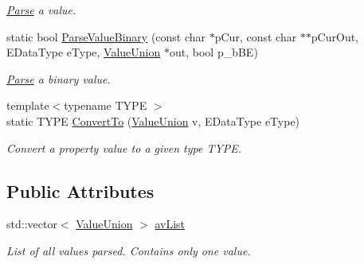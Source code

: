 \begin{DoxyCompactItemize}
\begin{DoxyCompactList}\small\item\em \hyperlink{struct_parse}{Parse} a value. \end{DoxyCompactList}\item 
\hypertarget{class_assimp_1_1_p_l_y_1_1_property_instance_a4ab7501c25c3cc1078b71b711981ecdf}{static bool \hyperlink{class_assimp_1_1_p_l_y_1_1_property_instance_a4ab7501c25c3cc1078b71b711981ecdf}{Parse\+Value\+Binary} (const char $\ast$p\+Cur, const char $\ast$$\ast$p\+Cur\+Out, E\+Data\+Type e\+Type, \hyperlink{union_assimp_1_1_p_l_y_1_1_property_instance_1_1_value_union}{Value\+Union} $\ast$out, bool p\+\_\+b\+B\+E)}\label{class_assimp_1_1_p_l_y_1_1_property_instance_a4ab7501c25c3cc1078b71b711981ecdf}

\begin{DoxyCompactList}\small\item\em \hyperlink{struct_parse}{Parse} a binary value. \end{DoxyCompactList}\item 
\hypertarget{class_assimp_1_1_p_l_y_1_1_property_instance_a6acdcac7cb8af53ec7b1d211fc114ed1}{{\footnotesize template$<$typename T\+Y\+P\+E $>$ }\\static T\+Y\+P\+E \hyperlink{class_assimp_1_1_p_l_y_1_1_property_instance_a6acdcac7cb8af53ec7b1d211fc114ed1}{Convert\+To} (\hyperlink{union_assimp_1_1_p_l_y_1_1_property_instance_1_1_value_union}{Value\+Union} v, E\+Data\+Type e\+Type)}\label{class_assimp_1_1_p_l_y_1_1_property_instance_a6acdcac7cb8af53ec7b1d211fc114ed1}

\begin{DoxyCompactList}\small\item\em Convert a property value to a given type T\+Y\+P\+E. \end{DoxyCompactList}\end{DoxyCompactItemize}
\subsection*{Public Attributes}
\begin{DoxyCompactItemize}
\item 
\hypertarget{class_assimp_1_1_p_l_y_1_1_property_instance_a8374023d72a7143fea3752d3a058a860}{std\+::vector$<$ \hyperlink{union_assimp_1_1_p_l_y_1_1_property_instance_1_1_value_union}{Value\+Union} $>$ \hyperlink{class_assimp_1_1_p_l_y_1_1_property_instance_a8374023d72a7143fea3752d3a058a860}{av\+List}}\label{class_assimp_1_1_p_l_y_1_1_property_instance_a8374023d72a7143fea3752d3a058a860}

\begin{DoxyCompactList}\small\item\em List of all values parsed. Contains only one value. \end{DoxyCompactList}\end{DoxyCompactItemize}


